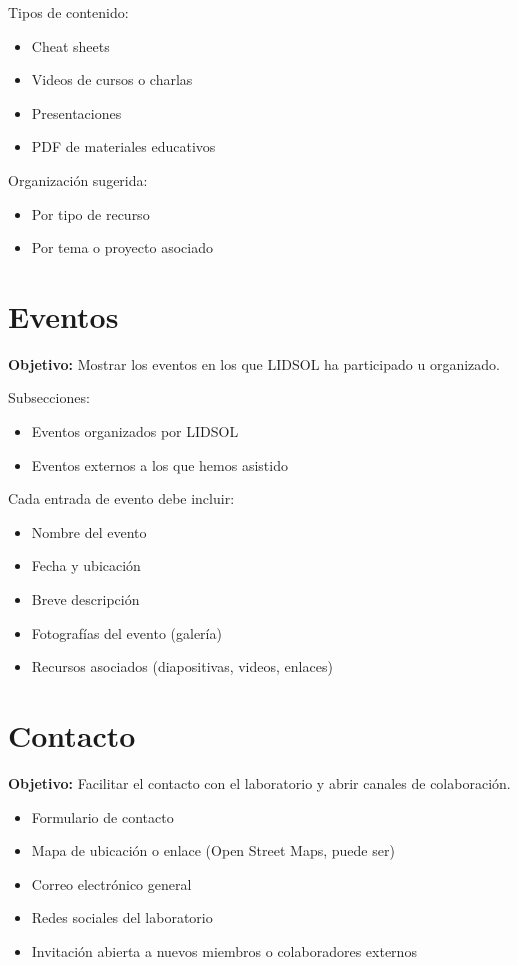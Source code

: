 \documentclass[12pt]{article}
\begin{document}
Tipos de contenido:
\begin{itemize}[label=--]
    \item Cheat sheets
    \item Videos de cursos o charlas
    \item Presentaciones
    \item PDF de materiales educativos
\end{itemize}

Organización sugerida:
\begin{itemize}[label=--]
    \item Por tipo de recurso
    \item Por tema o proyecto asociado
\end{itemize}

\section{Eventos}
\textbf{Objetivo:} Mostrar los eventos en los que LIDSOL ha participado u organizado.

Subsecciones:
\begin{itemize}
    \item Eventos organizados por LIDSOL
    \item Eventos externos a los que hemos asistido
\end{itemize}

Cada entrada de evento debe incluir:
\begin{itemize}[label=--]
    \item Nombre del evento
    \item Fecha y ubicación
    \item Breve descripción
    \item Fotografías del evento (galería)
    \item Recursos asociados (diapositivas, videos, enlaces)
\end{itemize}

\section{Contacto}
\textbf{Objetivo:} Facilitar el contacto con el laboratorio y abrir canales de colaboración.
\begin{itemize}[label=--]
    \item Formulario de contacto
    \item Mapa de ubicación o enlace (Open Street Maps, puede ser)
    \item Correo electrónico general
    \item Redes sociales del laboratorio
    \item Invitación abierta a nuevos miembros o colaboradores externos
\end{itemize}
\end{document}
